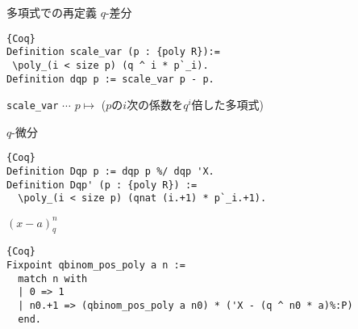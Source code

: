 \documentclass[dvipdfmx,cjk]{beamer}
\theoremstyle{mystyle}
\newcommand{\0}{\textbf{0}}
\begin{document}
\begin{frame}[fragile]{多項式での再定義}
	$q$-差分
	\begin{lstlisting}{Coq}
Definition scale_var (p : {poly R}):=
 \poly_(i < size p) (q ^ i * p`_i).
Definition dqp p := scale_var p - p. \end{lstlisting} \pause
{\tt scale\_var} $\cdots$ $p \mapsto$ ($p$の$i$次の係数を$q^i$倍した多項式) \pause

	$q$-微分
	\begin{lstlisting}{Coq}
Definition Dqp p := dqp p %/ dqp 'X.
Definition Dqp' (p : {poly R}) :=
  \poly_(i < size p) (qnat (i.+1) * p`_i.+1). \end{lstlisting} \pause
	$(x - a)^n_q$
	\begin{lstlisting}{Coq}
Fixpoint qbinom_pos_poly a n :=
  match n with
  | 0 => 1
  | n0.+1 => (qbinom_pos_poly a n0) * ('X - (q ^ n0 * a)%:P)
  end. \end{lstlisting}
\end{frame}

%	

% 
\end{document}
